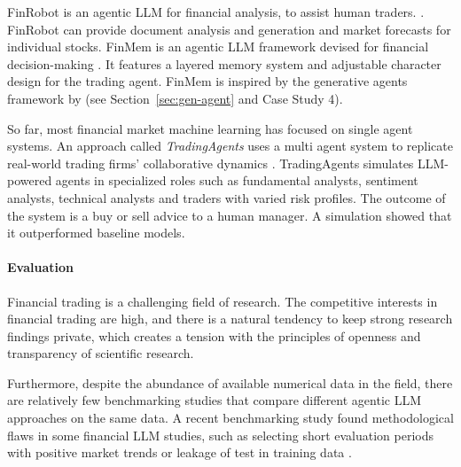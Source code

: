 FinRobot is an agentic LLM for financial analysis, to assist human traders.
\citep{yang2024finrobot}. FinRobot can provide document analysis and
generation and market forecasts for
individual stocks.
%
FinMem is an agentic LLM  framework devised for financial decision-making
\citep{yu2024finmem}. It features a layered memory system and
adjustable character design for the trading agent. FinMem is inspired
by the generative agents framework by \citet{park2023generative} (see Section~\ref{sec:gen-agent} and Case Study 4).

So far, most financial market machine learning has focused on single agent
systems. An approach called {\em TradingAgents} uses a multi agent
system to replicate real-world trading firms’ collaborative dynamics
\citep{xiao2024tradingagents}. TradingAgents simulates  LLM-powered
agents in specialized roles such as fundamental analysts,
sentiment analysts, technical analysts and traders with varied risk
profiles. The outcome of the system is a  buy or sell
advice to a human manager. A simulation showed that it outperformed baseline models.

\paragraph{Evaluation} Financial trading is a challenging field of research. The competitive interests in financial trading are high, and there is a natural tendency to keep strong research findings private, which creates a tension with the principles of openness and transparency of scientific research. 

Furthermore, despite the abundance of available numerical data in the field, there are relatively few benchmarking studies that compare different agentic LLM  approaches on the same data. A recent benchmarking study found  methodological flaws in some  financial LLM studies, such as selecting short evaluation periods with positive market trends or leakage of test in training data \citep{li2026can}. 







